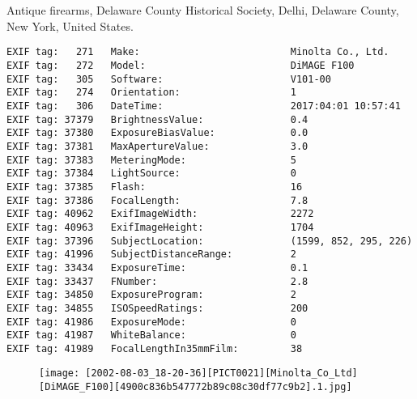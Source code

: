 \section{\protect{}}
\noindent Antique firearms, Delaware County Historical Society, Delhi, Delaware County, New York, United States.
\noindent
\begin{lstlisting}
EXIF tag:   271   Make:                          Minolta Co., Ltd.
EXIF tag:   272   Model:                         DiMAGE F100
EXIF tag:   305   Software:                      V101-00
EXIF tag:   274   Orientation:                   1
EXIF tag:   306   DateTime:                      2017:04:01 10:57:41
EXIF tag: 37379   BrightnessValue:               0.4
EXIF tag: 37380   ExposureBiasValue:             0.0
EXIF tag: 37381   MaxApertureValue:              3.0
EXIF tag: 37383   MeteringMode:                  5
EXIF tag: 37384   LightSource:                   0
EXIF tag: 37385   Flash:                         16
EXIF tag: 37386   FocalLength:                   7.8
EXIF tag: 40962   ExifImageWidth:                2272
EXIF tag: 40963   ExifImageHeight:               1704
EXIF tag: 37396   SubjectLocation:               (1599, 852, 295, 226)
EXIF tag: 41996   SubjectDistanceRange:          2
EXIF tag: 33434   ExposureTime:                  0.1
EXIF tag: 33437   FNumber:                       2.8
EXIF tag: 34850   ExposureProgram:               2
EXIF tag: 34855   ISOSpeedRatings:               200
EXIF tag: 41986   ExposureMode:                  0
EXIF tag: 41987   WhiteBalance:                  0
EXIF tag: 41989   FocalLengthIn35mmFilm:         38

\end{lstlisting}
\clearpage
\begin{figure}
\raggedleft
\texttt{[image: [2002-08-03\_18-20-36][PICT0021][Minolta\_Co\_Ltd][DiMAGE\_F100][4900c836b547772b89c08c30df77c9b2].1.jpg]}
\end{figure}


\clearpage
